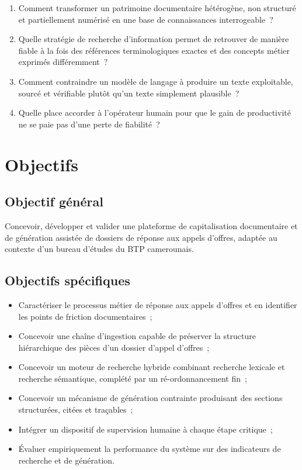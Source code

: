 \begin{enumerate}
  \item Comment transformer un patrimoine documentaire hétérogène, non
        structuré et partiellement numérisé en une base de connaissances
        interrogeable~?
  \item Quelle stratégie de recherche d'information permet de retrouver de
        manière fiable à la fois des références terminologiques exactes et des
        concepts métier exprimés différemment~?
  \item Comment contraindre un modèle de langage à produire un texte
        exploitable, sourcé et vérifiable plutôt qu'un texte simplement
        plausible~?
  \item Quelle place accorder à l'opérateur humain pour que le gain de
        productivité ne se paie pas d'une perte de fiabilité~?
\end{enumerate}

\section*{Objectifs}

\subsection*{Objectif général}

Concevoir, développer et valider une plateforme de capitalisation documentaire
et de génération assistée de dossiers de réponse aux appels d'offres, adaptée
au contexte d'un bureau d'études du BTP camerounais.

\subsection*{Objectifs spécifiques}

\begin{itemize}
  \item Caractériser le processus métier de réponse aux appels d'offres et en
        identifier les points de friction documentaires~;
  \item Concevoir une chaîne d'ingestion capable de préserver la structure
        hiérarchique des pièces d'un dossier d'appel d'offres~;
  \item Concevoir un moteur de recherche hybride combinant recherche lexicale
        et recherche sémantique, complété par un ré-ordonnancement fin~;
  \item Concevoir un mécanisme de génération contrainte produisant des sections
        structurées, citées et traçables~;
  \item Intégrer un dispositif de supervision humaine à chaque étape critique~;
  \item Évaluer empiriquement la performance du système sur des indicateurs de
        recherche et de génération.
\end{itemize}

